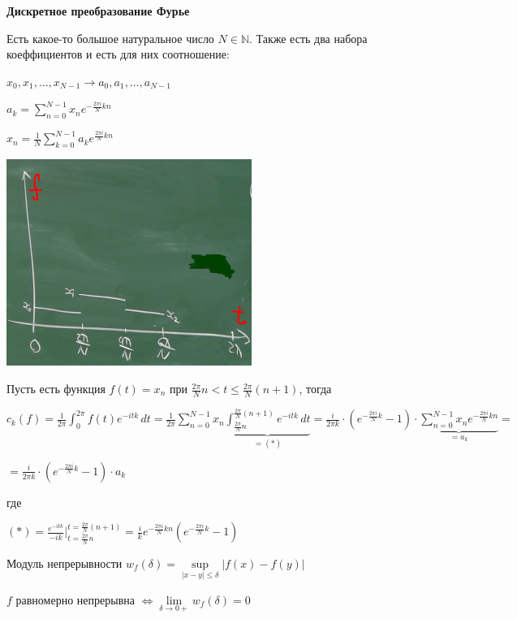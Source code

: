 \begin{theorem}
    \textbf{Дискретное преобразование Фурье}

    Есть какое-то большое натуральное число $N \in \mathbb{N}$. Также есть два набора коеффициентов и есть для них соотношение:

    $x_0, x_1, \ldots, x_{N - 1} \rightarrow a_0, a_1, \ldots, a_{N - 1}$

    $a_k = \sum\limits_{n = 0}^{N - 1} x_n e^{-\frac{2\pi i}{N} kn}$

    $x_n = \frac{1}{N} \sum\limits_{k = 0}^{N - 1} a_k e^{\frac{2\pi i}{N} kn}$

    \begin{center}
        \includegraphics[width=8cm]{assets/05-fourierreihe/dft.png}
    \end{center}

    Пусть есть функция $f(t) = x_n$ при $\frac{2\pi}{N}n < t \leqslant \frac{2\pi}{N} (n + 1)$, тогда

    $c_k (f) = \frac{1}{2\pi} \int_0^{2\pi} f(t) e^{-itk}\, dt =
    \frac{1}{2\pi} \sum\limits_{n = 0}^{N - 1} x_n \underbrace{\int_{\frac{2\pi}{N} n}^{\frac{2\pi}{N} (n + 1)} e^{-itk} \, dt}_{=(*)} =
    \frac{i}{2 \pi k} \cdot \left( e^{- \frac{2 \pi i}{N} k} - 1 \right) \cdot \underbrace{\sum\limits_{n=0}^{N - 1} x_n e^{- \frac{2 \pi i}{N} kn}}_{=a_k} =$

    $= \frac{i}{2 \pi k} \cdot \left( e^{- \frac{2 \pi i}{N} k} - 1 \right) \cdot a_k$


    где

    $(*) = \frac{e^{-itk}}{-ik} \bigg |_{t=\frac{2\pi}{N} n}^{t=\frac{2\pi}{N} (n + 1)} = \frac{i}{k} e^{- \frac{2\pi i}{N} kn} (e^{- \frac{2 \pi i}{N} k} - 1)$
\end{theorem}


\begin{definition}
    Модуль непрерывности $w_f (\delta) = \sup\limits_{|x - y| \leqslant \delta} |f(x) - f(y)|$

    \begin{remark}
        $f$ равномерно непрерывна $\Longleftrightarrow \lim\limits_{\delta \to 0+} w_f (\delta) = 0$
    \end{remark}
\end{definition}

